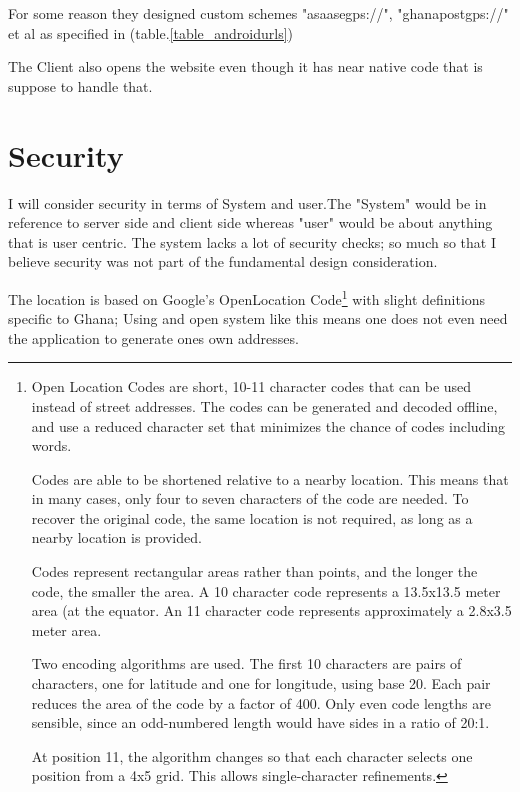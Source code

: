 \documentclass[conference,compsoc]{IEEEtran}
\begin{document}
For some reason they designed custom schemes "asaasegps://", "ghanapostgps://" et al as specified in (table.\ref{table_androidurls})

The Client also opens the website even though it has near native code that is suppose to handle that.

\section{Security}
I will consider security in terms of System and user.The "System" would be in reference to server side and client side whereas "user" would be about anything that is user centric.
The system lacks a lot of security checks; so much so that I believe security was not part of the fundamental design consideration.\newline

The location is based on Google's OpenLocation\cite{openlocation:website} \cite{openlocation:website2} Code\footnote{
Open Location Codes are short, 10-11 character codes that can be used instead
of street addresses. The codes can be generated and decoded offline, and use
a reduced character set that minimizes the chance of codes including words.

Codes are able to be shortened relative to a nearby location. This means that
in many cases, only four to seven characters of the code are needed.
To recover the original code, the same location is not required, as long as
a nearby location is provided.

Codes represent rectangular areas rather than points, and the longer the
code, the smaller the area. A 10 character code represents a 13.5x13.5
meter area (at the equator. An 11 character code represents approximately
a 2.8x3.5 meter area.

Two encoding algorithms are used. The first 10 characters are pairs of
characters, one for latitude and one for longitude, using base 20. Each pair
reduces the area of the code by a factor of 400. Only even code lengths are
sensible, since an odd-numbered length would have sides in a ratio of 20:1.

At position 11, the algorithm changes so that each character selects one
position from a 4x5 grid. This allows single-character refinements.
} with slight definitions specific to Ghana; Using and open system like this means one does not even need the application to generate ones own addresses.
\end{document}
